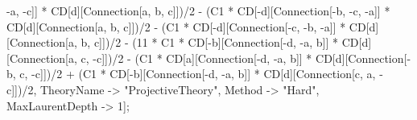 -a, -c]] * CD[d][Connection[a, b, c]])/2 - (C1 * CD[-d][Connection[-b, -c, -a]] * CD[d][Connection[a, b, c]])/2 - (C1 * CD[-d][Connection[-c, -b, -a]] * CD[d][Connection[a, b, c]])/2 - (11 * C1 * CD[-b][Connection[-d, -a, b]] * CD[d][Connection[a, c, -c]])/2 - (C1 * CD[a][Connection[-d, -a, b]] * CD[d][Connection[-b, c, -c]])/2 + (C1 * CD[-b][Connection[-d, -a, b]] * CD[d][Connection[c, a, -c]])/2, TheoryName -> "ProjectiveTheory", Method -> "Hard", MaxLaurentDepth -> 1]; 